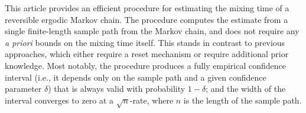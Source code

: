This article provides an efficient procedure for estimating the mixing
time of a reversible ergodic Markov chain.
The procedure computes the estimate from a single finite-length sample
path from the Markov chain, and does not require any \emph{a priori}
bounds on the mixing time itself.
This stands in contrast to previous approaches, which either require a
reset mechanism or require additional prior knowledge.
Most notably, the procedure produces a fully empirical confidence
interval (i.e., it depends only on the sample path and a given
confidence parameter $\delta$) that is always valid with probability
$1-\delta$; and the width of the interval converges to zero at a
$\sqrt{n}$-rate, where $n$ is the length of the sample path.

%
%
